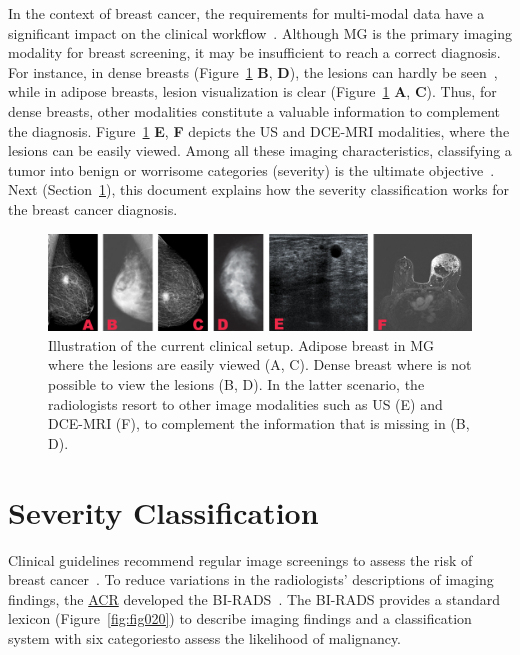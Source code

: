 In the context of breast cancer, the requirements for multi-modal data have a significant impact on the clinical workflow~\cite{10.1117/1.JBO.22.4.046008}.
Although \ac{MG} is the primary imaging modality for breast screening, it may be insufficient to reach a correct diagnosis.
For instance, in dense breasts (Figure~\ref{fig:fig005} {\bf B}, {\bf D}), the lesions can hardly be seen~\cite{10.1093/jbi/wbaa010}, while in adipose breasts, lesion visualization is clear (Figure~\ref{fig:fig005} {\bf A}, {\bf C}).
Thus, for dense breasts, other modalities constitute a valuable information to complement the diagnosis.
Figure~\ref{fig:fig005} {\bf E}, {\bf F} depicts the \ac{US} and \ac{DCE}-\ac{MRI} modalities, where the lesions can be easily viewed.
Among all these imaging characteristics, classifying a tumor into benign or worrisome categories (severity) is the ultimate objective~\cite{SHAN2016980}.
Next (Section~\ref{sec:sec002003}), this document explains how the severity classification works for the breast cancer diagnosis.

\begin{figure}[htbp]
\centering
\includegraphics[width=\columnwidth]{images/fig005}
\caption{Illustration of the current clinical setup. Adipose breast in MG where the lesions are easily viewed (A, C). Dense breast where is not possible to view the lesions (B, D). In the latter scenario, the radiologists resort to other image modalities such as US (E) and DCE-MRI (F), to complement the information that is missing in (B, D).}
\label{fig:fig005}
\end{figure}

\section{Severity Classification}
\label{sec:sec002003}

Clinical guidelines recommend regular image screenings to assess the risk of breast cancer~\cite{MIAO201817}.
To reduce variations in the radiologists’ descriptions of imaging findings, the \href{https://www.acr.org/}{\ac{ACR}} developed the \ac{BI-RADS}~\cite{d2018breast}.
The \ac{BI-RADS} provides a standard lexicon (Figure~\ref{fig:fig020}) to describe imaging findings and a classification system with six categories\footnotemark[5] to assess the likelihood of malignancy.

